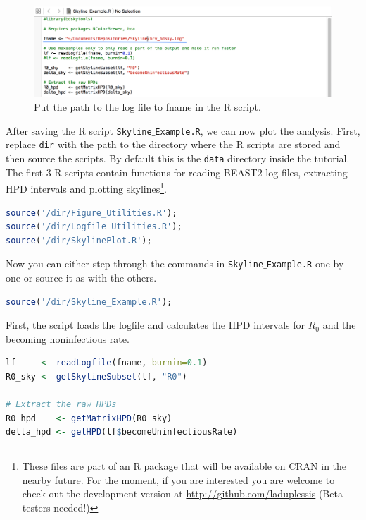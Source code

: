 \documentclass[11pt]{article}
\begin{document}
\begin{figure}[h!]
\centering
\includegraphics[width=\textwidth]{figures/find_log_file.png}
\caption{\small Put the path to the log file to fname in the R script.}
\label{fig:r_script}
\end{figure}

After saving the R script \texttt{Skyline$\_$Example.R}, we can now plot the analysis.
First, replace \texttt{dir} with the path to the directory where the R scripts are stored and then source the scripts. By default this is the \texttt{data} directory inside the tutorial. The first 3 R scripts contain functions for reading BEAST2 log files, extracting HPD intervals and plotting skylines\footnote{These files are part of an R package that will be available on CRAN in the nearby future. For the moment, if you are interested you are welcome to check out the development version at \url{http://github.com/laduplessis}  (Beta testers needed!)}.


\begin{lstlisting}[language=R]
source('/dir/Figure_Utilities.R');
source('/dir/Logfile_Utilities.R');
source('/dir/SkylinePlot.R');
\end{lstlisting}

Now you can either step through the commands in \texttt{Skyline$\_$Example.R} one by one or source it as with the others. 

\begin{lstlisting}[language=R]
source('/dir/Skyline_Example.R');
\end{lstlisting}

First, the script loads the logfile and calculates the HPD intervals for $R_0$ and the becoming noninfectious rate. 

\begin{lstlisting}[language=R]
lf     <- readLogfile(fname, burnin=0.1) 
R0_sky <- getSkylineSubset(lf, "R0") 

# Extract the raw HPDs 
R0_hpd    <- getMatrixHPD(R0_sky) 
delta_hpd <- getHPD(lf$becomeUninfectiousRate) 
\end{lstlisting}
\end{document}
